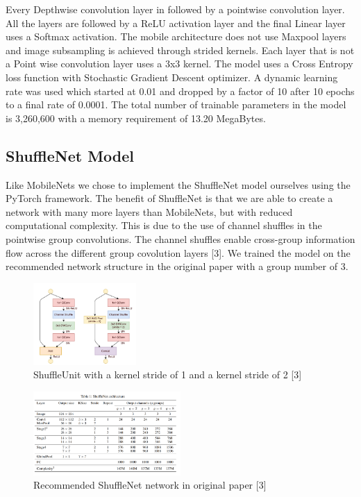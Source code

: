 \documentclass[10pt,twocolumn,letterpaper]{article}
\begin{document}
Every Depthwise convolution layer in followed by a pointwise convolution layer. All the layers are followed by a ReLU activation layer and the final Linear layer uses a Softmax activation. The mobile architecture does not use Maxpool layers and image subsampling is achieved through strided kernels. Each layer that is not a Point wise convolution layer uses a 3x3 kernel. The model uses a Cross Entropy loss function with Stochastic Gradient Descent optimizer. A dynamic learning rate was used which started at 0.01 and dropped by a factor of 10 after 10 epochs to a final rate of 0.0001. 
The total number of trainable parameters in the model is  3,260,600 with a memory requirement of 13.20 MegaBytes.   

\subsection{ShuffleNet Model}
Like MobileNets we chose to implement the ShuffleNet model ourselves using the PyTorch framework. The benefit of ShuffleNet is that we are able to create a network with many more layers than MobileNets, but with reduced computational complexity. This is due to the use of channel shuffles in the pointwise group convolutions. The channel shuffles enable cross-group information flow across the different group covolution layers [3]. We trained the model on the recommended network structure in the original paper with a group number of 3.

\begin{figure}[ht]
\caption{ShuffleUnit with a kernel stride of 1 and a kernel stride of 2 [3]}
\centering
\includegraphics[width=0.35\textwidth]{shuffleunit}
\end{figure}


\begin{figure}[ht]
\caption{Recommended ShuffleNet network in original paper [3]}
\centering
\includegraphics[width=0.5\textwidth]{shufflenet}
\end{figure}
\end{document}
